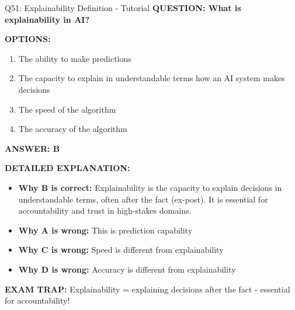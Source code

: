 \documentclass[8pt]{beamer}
\begin{document}
	\begin{frame}{Q51: Explainability Definition - Tutorial}
		\fontsize{6.5}{7.5}\selectfont
		\textbf{QUESTION: What is explainability in AI?}
		
		\vspace{0.1cm}
		\textbf{OPTIONS:}
		\begin{enumerate}
			\item The ability to make predictions
			\item The capacity to explain in understandable terms how an AI system makes decisions
			\item The speed of the algorithm
			\item The accuracy of the algorithm
		\end{enumerate}
		
		\vspace{0.1cm}
		\textcolor{myblue}{\textbf{ANSWER: B}}
		
		\vspace{0.1cm}
		\textbf{DETAILED EXPLANATION:}
		\begin{itemize}
			\item \textbf{Why B is correct:} Explainability is the capacity to explain decisions in understandable terms, often after the fact (ex-post). It is essential for accountability and trust in high-stakes domains.
			\item \textbf{Why A is wrong:} This is prediction capability
			\item \textbf{Why C is wrong:} Speed is different from explainability
			\item \textbf{Why D is wrong:} Accuracy is different from explainability
		\end{itemize}
		
		\textcolor{myred}{\textbf{EXAM TRAP:}} Explainability = \textcolor{myblue}{explaining decisions after the fact} - essential for accountability!
	\end{frame}
	
\end{document}
